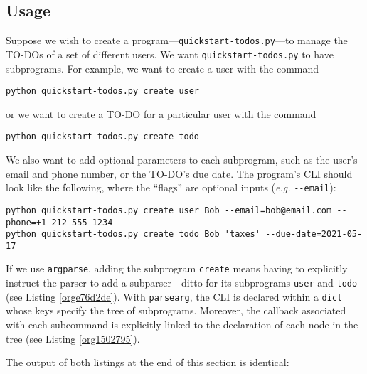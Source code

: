 \documentclass[10pt]{amsart}
\numberwithin{equation}{section}
\begin{document}
\subsection{Usage}
\label{sec:org8c7ab48}
\label{org56b42d2}
Suppose we wish to create a program---\texttt{quickstart-todos.py}---to manage the TO-DOs
of a set of different users. We want \texttt{quickstart-todos.py} to have subprograms. For
example, we want to create a user with the command

\begin{verbatim}
python quickstart-todos.py create user
\end{verbatim}


or we want to create a TO-DO for a particular user with the command

\begin{verbatim}
python quickstart-todos.py create todo
\end{verbatim}


We also want to add optional parameters to each subprogram, such as
the user's email and phone number, or the TO-DO's due date. 
The program's CLI should look like the following, where the
``flags'' are optional inputs (\emph{e.g.} \texttt{-{}-email}):
\begin{verbatim}
python quickstart-todos.py create user Bob --email=bob@email.com --phone=+1-212-555-1234
python quickstart-todos.py create todo Bob 'taxes' --due-date=2021-05-17
\end{verbatim}
If we use \texttt{argparse}, adding the subprogram \texttt{create} means having to
explicitly instruct the parser to add a subparser---ditto for its subprograms \texttt{user} and \texttt{todo}
(see Listing \ref{orge76d2de}).
With \texttt{parsearg}, the CLI is declared
within a \texttt{dict} whose keys specify the tree of subprograms.
Moreover, the callback associated with each subcommand is explicitly linked to
the declaration of each node in the tree
(see Listing \ref{org1502795}).

The output of both listings at the end of this section is identical:
\end{document}
